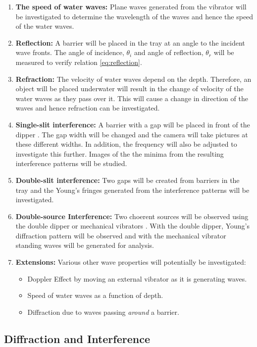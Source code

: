\documentclass{article}
\begin{document}
\begin{enumerate}
  \item \textbf{The speed of water waves:} Plane waves generated from the vibrator will be investigated to determine the wavelength of the waves and hence the speed of the water waves.
  \item \textbf{Reflection:} A barrier will be placed in the tray at an angle to the incident wave fronts. The angle of incidence, $\theta_i$ and angle of reflection, $\theta_r$ will be measured to verify relation \eqref{eq:reflection}.
  \item \textbf{Refraction:} The velocity of water waves depend on the depth. Therefore, an object will be placed underwater will result in the change of velocity of the water waves as they pass over it. This will cause a change in direction of the waves and hence refraction can be investigated.
  \item \textbf{Single-slit interference:} A barrier with a gap will be placed in front of the dipper \cite{Paper01}. The gap width will be changed and the camera will take pictures at these different widths. In addition, the frequency will also be adjusted to investigate this further. Images of the the minima from the resulting interference patterns will be studied.
  \item \textbf{Double-slit interference:} Two gaps will be created from barriers in the tray and the Young's fringes generated from the interference patterns will be investigated. 
  \item \textbf{Double-source Interference:} Two choerent sources will be observed using the double dipper or mechanical vibrators \cite{Paper01}. With the double dipper, Young's diffraction pattern will be observed and with the mechanical vibrator standing waves will be generated for analysis.
  \item \textbf{Extensions:} Various other wave properties will potentially be investigated:
  	\begin{itemize}
     \item Doppler Effect by moving an external vibrator as it is generating waves.
     \item Speed of water waves as a function of depth.
     \item Diffraction due to waves passing \textit{around} a barrier.
   \end{itemize}
\end{enumerate}

\subsection{Diffraction and Interference}
\label{ssec:diffraction-method}
\end{document}
